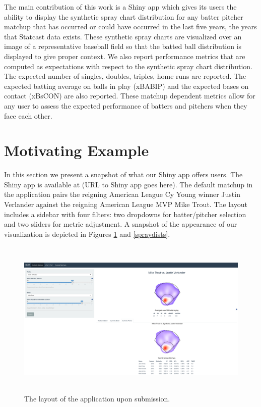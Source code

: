 \documentclass[11pt]{article}
\begin{document}
The main contribution of this work is a Shiny app which gives its users the ability to display the synthetic spray chart distribution for any batter pitcher matchup that has occurred or could have occurred in the last five years, the years that Statcast data exists. These synthetic spray charts are visualized over an image of a representative baseball field so that the batted ball distribution is displayed to give proper context. We also report performance metrics that are computed as expectations with respect to the synthetic spray chart distribution. The expected number of singles, doubles, triples, home runs are reported. The expected batting average on balls in play (xBABIP) and the expected bases on contact (xBsCON) are also reported. These matchup dependent metrics allow for any user to assess the expected performance of batters and pitchers when they face each other. 



\section{Motivating Example}

In this section we present a snapshot of what our Shiny app offers users. The Shiny app is available at (URL to Shiny app goes here). The default matchup in the application pairs the reigning American League Cy Young winner Justin Verlander against the reigning American League MVP Mike Trout. The layout includes a sidebar with four filters: two dropdowns for batter/pitcher selection and two sliders for metric adjustment. A snapshot of the appearance of our visualization is depicted in Figures \ref{layout} and \ref{spraydists}.


\begin{figure}
\centering
    \includegraphics[width=5.5in, height=3in]{layout.png}
    \caption{The layout of the application upon submission.}
    \label{layout}
\end{figure}
\end{document}
